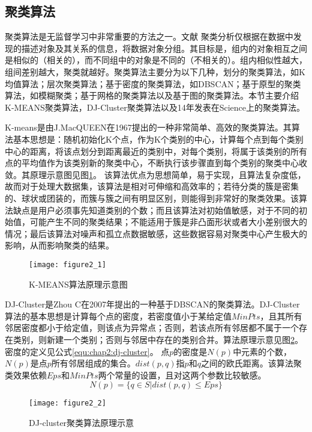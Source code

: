 \subsection{聚类算法}
聚类算法是无监督学习中非常重要的方法之一。文献\cite{pang2006introduction} 聚类分析仅根据在数据中发现的描述对象及其关系的信息，将数据对象分组。其目标是，组内的对象相互之间是相似的（相关的），而不同组中的对象是不同的（不相关的）。组内相似性越大，组间差别越大，聚类就越好。聚类算法主要分为以下几种，划分的聚类算法，如K均值算法；层次聚类算法；基于密度的聚类算法，如DBSCAN；基于原型的聚类算法，如模糊聚类；基于网格的聚类算法以及基于图的聚类算法。本节主要介绍K-MEANS聚类算法，DJ-Cluster聚类算法以及14年发表在Science上的聚类算法。
\par K-means是由J.MacQUEEN在1967提出的一种非常简单、高效的聚类算法。其算法基本思想是：随机初始化K个点，作为K个类别的中心，计算每个点到每个类别中心的距离，将该点划分到距离最近的类别中，对每个类别，将属于该类别的所有点的平均值作为该类别新的聚类中心，不断执行该步骤直到每个类别的聚类中心收敛。其原理示意图见图\ref{fig:2_1}。 该算法优点为思想简单，易于实现，且算法复杂度低，故而对于处理大数据集，该算法是相对可伸缩和高效率的；若待分类的簇是密集的、球状或团装的，而簇与簇之间有明显区别，则能得到非常好的聚类效果。该算法缺点是用户必须事先知道类别的个数；而且该算法对初始值敏感，对于不同的初始值，可能产生不同的聚类结果；不能适用于簇是非凸面形状或者大小差别很大的情况；最后该算法对噪声和孤立点数据敏感，这些数据容易对聚类中心产生极大的影响，从而影响聚类的结果。
\begin{figure}[htp]
\centering
\texttt{[image: figure2\_1]}
\caption{K-MEANS算法原理示意图}
\label{fig:2_1}
\end{figure}
\par DJ-Cluster是Zhou C在2007年提出的一种基于DBSCAN的聚类算法。DJ-Cluster算法的基本思想是计算每个点的密度，若密度值小于某给定值$MinPts$，且其所有邻居密度都小于给定值，则该点为异常点；否则，若该点所有邻居都不属于一个存在类别，则新建一个类别；否则与邻居中存在的类别合并。算法原理示意见图\ref{fig:2_2}。密度的定义见公式\ref{equ:chap2:dj-cluster}。 点$p$的密度是$N(p)$中元素的个数，$N(p)$是点$p$所有邻居组成的集合。$dist(p,q)$指$p$和$q$之间的欧氏距离。该算法聚类效果依赖$Eps$和$MinPts$两个常量的设置，且对这两个参数比较敏感。
\begin{equation}
\label{equ:chap2:dj-cluster}
N(p)=\{q \in S|dist(p,q) \leq Eps\}
\end{equation}
\begin{figure}[htp]
\centering
\texttt{[image: figure2\_2]}
\caption{DJ-cluster聚类算法原理示意}
\label{fig:2_2}
\end{figure}
